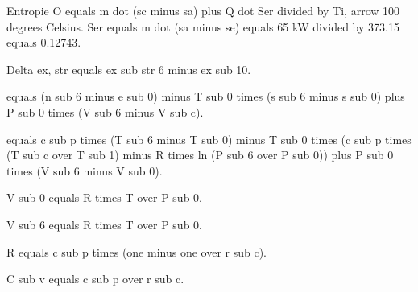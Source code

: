 Entropie
O equals m dot (sc minus sa) plus Q dot Ser divided by Ti, arrow 100 degrees Celsius.
Ser equals m dot (sa minus se) equals 65 kW divided by 373.15 equals 0.12743.

Delta ex, str equals ex sub str 6 minus ex sub 10.

equals (n sub 6 minus e sub 0) minus T sub 0 times (s sub 6 minus s sub 0) plus P sub 0 times (V sub 6 minus V sub c).

equals c sub p times (T sub 6 minus T sub 0) minus T sub 0 times (c sub p times (T sub c over T sub 1) minus R times ln (P sub 6 over P sub 0)) plus P sub 0 times (V sub 6 minus V sub 0).

V sub 0 equals R times T over P sub 0.

V sub 6 equals R times T over P sub 0.

R equals c sub p times (one minus one over r sub c).

C sub v equals c sub p over r sub c.